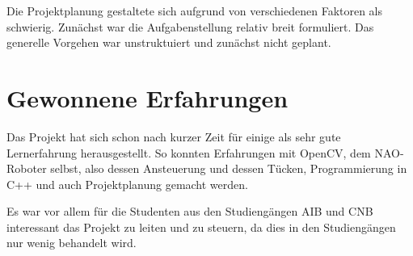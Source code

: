         Die Projektplanung gestaltete sich aufgrund von verschiedenen Faktoren
        als schwierig.
        Zunächst war die Aufgabenstellung relativ breit formuliert.
        Das generelle Vorgehen war unstruktuiert und zunächst nicht geplant.

    \section{Gewonnene Erfahrungen}

        Das Projekt hat sich schon nach kurzer Zeit für einige als sehr gute
        Lernerfahrung herausgestellt.
        So konnten Erfahrungen mit OpenCV, dem NAO-Roboter selbst, also dessen
        Ansteuerung und dessen Tücken, Programmierung in C++ und auch
        Projektplanung gemacht werden.

        Es war vor allem für die Studenten aus den Studiengängen AIB und CNB
        interessant das Projekt zu leiten und zu steuern, da dies in den
        Studiengängen nur wenig behandelt wird.

